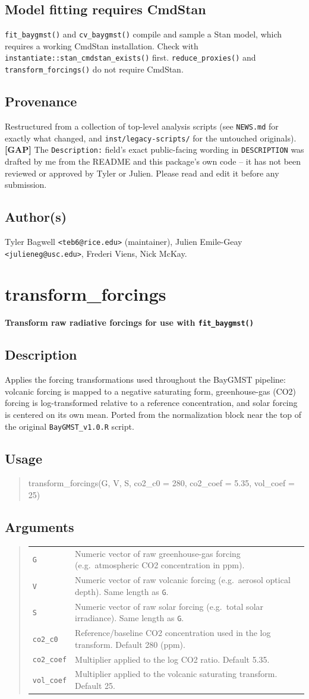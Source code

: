 \documentclass[10pt]{article}
\newcommand{\gap}[1]{\textcolor{gapred}{\textbf{[GAP]} #1}}
\newcommand{\rdtopic}[1]{\clearpage\section{#1}}
\newcommand{\rdsub}[1]{\subsection*{#1}}
\newenvironment{rdusage}{\begin{quote}\ttfamily\small}{\end{quote}}
\begin{document}
\rdsub{Model fitting requires CmdStan}
\texttt{fit\_baygmst()} and \texttt{cv\_baygmst()} compile and sample a Stan
model, which requires a working CmdStan installation. Check with
\texttt{instantiate::stan\_cmdstan\_exists()} first. \texttt{reduce\_proxies()}
and \texttt{transform\_forcings()} do not require CmdStan.

\rdsub{Provenance}
Restructured from a collection of top-level analysis scripts (see
\texttt{NEWS.md} for exactly what changed, and
\texttt{inst/legacy-scripts/} for the untouched originals).
\gap{The \texttt{Description:} field's exact public-facing wording in
\texttt{DESCRIPTION} was drafted by me from the README and this package's
own code -- it has not been reviewed or approved by Tyler or Julien. Please
read and edit it before any submission.}

\rdsub{Author(s)}
Tyler Bagwell \texttt{<teb6@rice.edu>} (maintainer), Julien Emile-Geay
\texttt{<julieneg@usc.edu>}, Frederi Viens, Nick McKay.

\rdtopic{transform\_forcings}
\textbf{Transform raw radiative forcings for use with \texttt{fit\_baygmst()}}

\rdsub{Description}
Applies the forcing transformations used throughout the BayGMST pipeline:
volcanic forcing is mapped to a negative saturating form, greenhouse-gas
(CO2) forcing is log-transformed relative to a reference concentration, and
solar forcing is centered on its own mean. Ported from the normalization
block near the top of the original \texttt{BayGMST\_v1.0.R} script.

\rdsub{Usage}
\begin{rdusage}
transform\_forcings(G, V, S, co2\_c0 = 280, co2\_coef = 5.35, vol\_coef = 25)
\end{rdusage}

\rdsub{Arguments}
\begin{quote}
\begin{tabular}{@{}p{3cm}p{11cm}@{}}
\texttt{G} & Numeric vector of raw greenhouse-gas forcing (e.g.\ atmospheric CO2 concentration in ppm). \\[0.3em]
\texttt{V} & Numeric vector of raw volcanic forcing (e.g.\ aerosol optical depth). Same length as \texttt{G}. \\[0.3em]
\texttt{S} & Numeric vector of raw solar forcing (e.g.\ total solar irradiance). Same length as \texttt{G}. \\[0.3em]
\texttt{co2\_c0} & Reference/baseline CO2 concentration used in the log transform. Default 280 (ppm). \\[0.3em]
\texttt{co2\_coef} & Multiplier applied to the log CO2 ratio. Default 5.35. \\[0.3em]
\texttt{vol\_coef} & Multiplier applied to the volcanic saturating transform. Default 25. \\
\end{tabular}
\end{quote}
\end{document}
